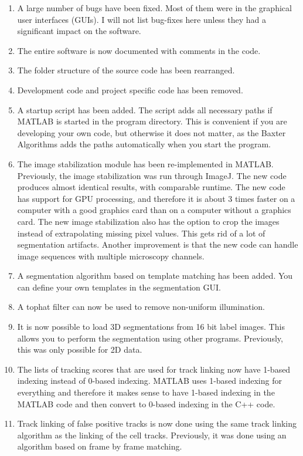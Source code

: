 \documentclass[a4paper, oneside, onecolumn, 11pt]{article}
\begin{document}
\begin{enumerate}
  \item A large number of bugs have been fixed. Most of them were in the graphical user interfaces (GUIs). I will not list bug-fixes here unless they had a significant impact on the software.

  \item The entire software is now documented with comments in the code.
  \item The folder structure of the source code has been rearranged.
  \item Development code and project specific code has been removed.
  \item A startup script has been added. The script adds all necessary paths if MATLAB is started in the program directory. This is convenient if you are developing your own code, but otherwise it does not matter, as the Baxter Algorithms adds the paths automatically when you start the program.
  \item The image stabilization module has been re-implemented in MATLAB. Previously, the image stabilization was run through ImageJ. The new code produces almost identical results, with comparable runtime. The new code has support for GPU processing, and therefore it is about 3 times faster on a computer with a good graphics card than on a computer without a graphics card. The new image stabilization also has the option to crop the images instead of extrapolating missing pixel values. This gets rid of a lot of segmentation artifacts. Another improvement is that the new code can handle image sequences with multiple microscopy channels.
  \item A segmentation algorithm based on template matching has been added. You can define your own templates in the segmentation GUI.
  \item A tophat filter can now be used to remove non-uniform illumination.
  \item It is now possible to load 3D segmentations from 16 bit label images. This allows you to perform the segmentation using other programs. Previously, this was only possible for 2D data.
  \item The lists of tracking scores that are used for track linking now have 1-based indexing instead of 0-based indexing. MATLAB uses 1-based indexing for everything and therefore it makes sense to have 1-based indexing in the MATLAB code and then convert to 0-based indexing in the C++ code.
  \item Track linking of false positive tracks is now done using the same track linking algorithm as the linking of the cell tracks. Previously, it was done using an algorithm based on frame by frame matching.

\end{enumerate}
\end{document}
